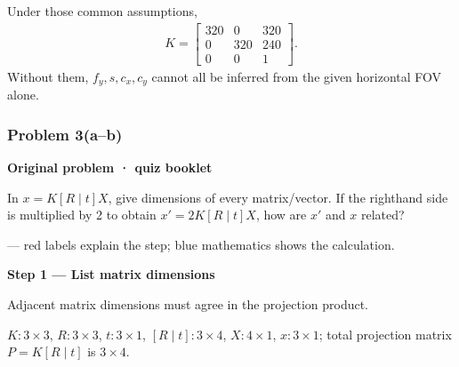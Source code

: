 \documentclass[letterpaper,11pt,english,openany,oneside]{jupyterBook}
\begin{document}
\sphinxAtStartPar
Under those common assumptions,
{\color{QuizMathBlue} \begin{equation*}
\begin{split}
\boxed{K=\begin{bmatrix}320&0&320\\0&320&240\\0&0&1\end{bmatrix}}.
\end{split}
\end{equation*}}
\sphinxAtStartPar
Without them, {\color{QuizMathBlue} \(f_y,s,c_x,c_y\)} cannot all be inferred from the given horizontal FOV alone.

\par


\subsubsection{Problem 3(a–b)}
\label{\detokenize{lectures/lecture03/quiz-workbook:problem-3-ab}}\label{\detokenize{lectures/lecture03/quiz-workbook:quiz-10-q3}}\label{\detokenize{lectures/lecture03/quiz-workbook:ex-lec03-principal}}
\par\medskip\textbf{Original problem · quiz booklet}\par\smallskip

\sphinxAtStartPar
In \(x=K[R\mid t]X\), give dimensions of every matrix/vector. If the right\sphinxhyphen{}hand side is multiplied by 2 to obtain \(x'=2K[R\mid t]X\), how are \(x'\) and \(x\) related?

\par\medskip

\sphinxAtStartPar
{} — red labels explain the step; blue mathematics shows the calculation.

\par\medskip{}
{\color{QuizStepRed}\bfseries Step 1 — List matrix dimensions}\par\smallskip

\sphinxAtStartPar
{} Adjacent matrix dimensions must agree in the projection product.

\sphinxAtStartPar
{\color{QuizMathBlue} \(K:3\times3\)}, {\color{QuizMathBlue} \(R:3\times3\)}, {\color{QuizMathBlue} \(t:3\times1\)}, {\color{QuizMathBlue} \([R\mid t]:3\times4\)}, {\color{QuizMathBlue} \(X:4\times1\)}, {\color{QuizMathBlue} \(x:3\times1\)}; total projection matrix {\color{QuizMathBlue} \(P=K[R\mid t]\)} is {\color{QuizMathBlue} \(3\times4\)}.
\end{document}
